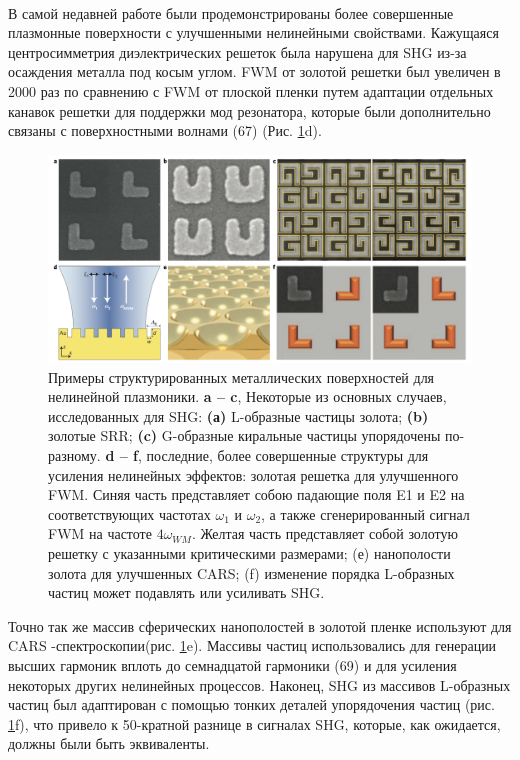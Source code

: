 \\
\hspace*{2mm}
В самой недавней работе были продемонстрированы более совершенные плазмонные поверхности с улучшенными нелинейными свойствами. Кажущаяся центросимметрия диэлектрических решеток была нарушена для SHG из-за осаждения металла под косым углом. FWM от золотой решетки был увеличен в 2000 раз по сравнению с FWM от плоской пленки путем адаптации отдельных канавок решетки для поддержки мод резонатора, которые были дополнительно связаны с поверхностными волнами (67) (Рис. \ref{mettals}d). 
\begin{figure}[h!]
	\centering
	\includegraphics[width=0.9\linewidth]{images/mettals.png}
	\caption{Примеры структурированных металлических поверхностей для нелинейной плазмоники. \textbf{a – c}, Некоторые из основных случаев, исследованных для SHG: \textbf{(а)} L-образные частицы золота; \textbf{(b) }золотые SRR; \textbf{(c)} G-образные киральные частицы упорядочены по-разному. \textbf{d – f},  последние, более совершенные структуры для усиления нелинейных эффектов: золотая решетка для улучшенного FWM. Синяя часть представляет собою падающие поля E1 и E2 на соответствующих частотах $\omega_1$ и $\omega_2$, а также сгенерированный сигнал FWM на частоте $4\omega_{WM}$. Желтая часть представляет собой золотую решетку с указанными критическими размерами; (е) нанополости золота для улучшенных CARS; (f) изменение порядка L-образных частиц может подавлять или усиливать SHG.}
	\label{mettals}
\end{figure}
Точно так же массив сферических нанополостей в золотой пленке используют для CARS -спектроскопии(рис. \ref{mettals}e). Массивы частиц использовались для генерации высших гармоник вплоть до семнадцатой гармоники (69) и для усиления некоторых других нелинейных процессов. Наконец, SHG из массивов L-образных частиц был адаптирован с помощью тонких деталей упорядочения частиц (рис. \ref{mettals}f), что привело к 50-кратной разнице в сигналах SHG, которые, как ожидается, должны были быть эквиваленты.

